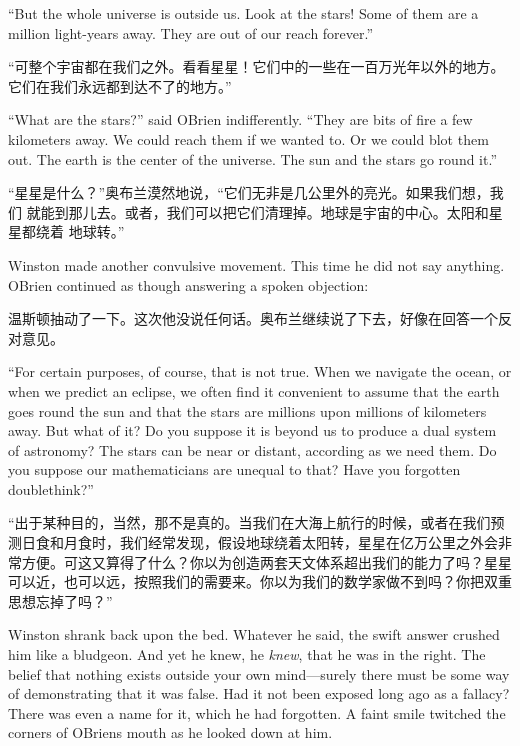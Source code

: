 \begin{paracol}{2}
\switchcolumn*

``But the whole universe is outside us. Look at the stars! Some of them
are a million light-years away. They are out of our reach forever.''

\switchcolumn

``可整个宇宙都在我们之外。看看星星！它们中的一些在一百万光年以外的地方。它们在我们永远都到达不了的地方。''

\switchcolumn*

``What are the stars?'' said O\textquotesingle Brien indifferently. ``They
are bits of fire a few kilometers away. We could reach them if we wanted
to. Or we could blot them out. The earth is the center of the universe.
The sun and the stars go round it.''

\switchcolumn

``星星是什么？''奥布兰漠然地说，``它们无非是几公里外的亮光。如果我们想，我们
就能到那儿去。或者，我们可以把它们清理掉。地球是宇宙的中心。太阳和星星都绕着
地球转。''

\switchcolumn*

Winston made another convulsive movement. This time he did not say
anything. O\textquotesingle Brien continued as though answering a spoken
objection:

\switchcolumn

温斯顿抽动了一下。这次他没说任何话。奥布兰继续说了下去，好像在回答一个反对意见。

\switchcolumn*

``For certain purposes, of course, that is not true. When we navigate the
ocean, or when we predict an eclipse, we often find it convenient to
assume that the earth goes round the sun and that the stars are millions
upon millions of kilometers away. But what of it? Do you suppose it is
beyond us to produce a dual system of astronomy? The stars can be near
or distant, according as we need them. Do you suppose our mathematicians
are unequal to that? Have you forgotten doublethink?''

\switchcolumn

``出于某种目的，当然，那不是真的。当我们在大海上航行的时候，或者在我们预测日食和月食时，我们经常发现，假设地球绕着太阳转，星星在亿万公里之外会非常方便。可这又算得了什么？你以为创造两套天文体系超出我们的能力了吗？星星可以近，也可以远，按照我们的需要来。你以为我们的数学家做不到吗？你把双重思想忘掉了吗？''

\switchcolumn*

Winston shrank back upon the bed. Whatever he said, the swift answer
crushed him like a bludgeon. And yet he knew, he \emph{knew}, that he
was in the right. The belief that nothing exists outside your own
mind---surely there must be some way of demonstrating that it was false.
Had it not been exposed long ago as a fallacy? There was even a name for
it, which he had forgotten. A faint smile twitched the corners of
O\textquotesingle Brien\textquotesingle s mouth as he looked down at
him.


\end{paracol}
